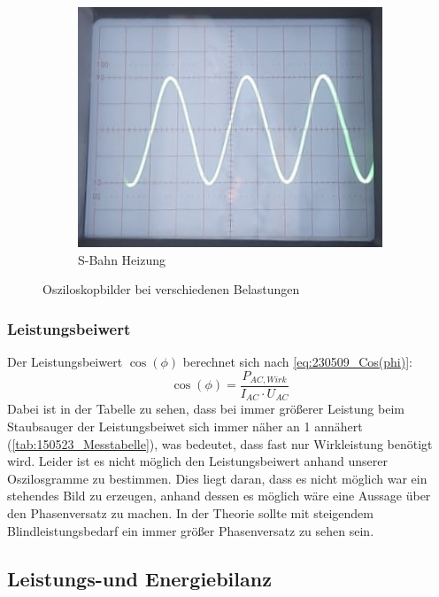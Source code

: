 \begin{figure}[H]
\begin{subfigure}[c]{0.19\textwidth}
		\includegraphics[width=\textwidth]{Abbildungen/Oszi_S-Bahn_Heiz.jpg}
		\caption{S-Bahn Heizung}
	\end{subfigure}
	\caption{Osziloskopbilder bei verschiedenen Belastungen}
	\label{fig:oszi}
\end{figure}


\subsubsection{Leistungsbeiwert}
Der Leistungsbeiwert $ \cos(\phi) $ berechnet sich nach \autoref{eq:230509_Cos(phi)}:
%
\begin{equation}
	\cos(\phi)=\frac{ P_{ AC,Wirk } }{  I_{ AC } \cdot U_{AC }}
	\label{eq:230509_Cos(phi)}
\end{equation}
%
Dabei ist in der Tabelle zu sehen, dass bei immer größerer Leistung beim Staubsauger der Leistungsbeiwet sich immer näher an 1 annähert (\autoref{tab:150523_Messtabelle}), was bedeutet, dass fast nur Wirkleistung benötigt wird. 
Leider ist es nicht möglich den Leistungsbeiwert anhand unserer Oszilosgramme zu bestimmen. 
Dies liegt daran, dass es nicht möglich war ein stehendes Bild zu erzeugen, anhand dessen es möglich wäre eine Aussage über den Phasenversatz zu machen. 
In der Theorie sollte mit steigendem Blindleistungsbedarf ein immer größer Phasenversatz zu sehen sein.

\subsection{Leistungs-und Energiebilanz}
